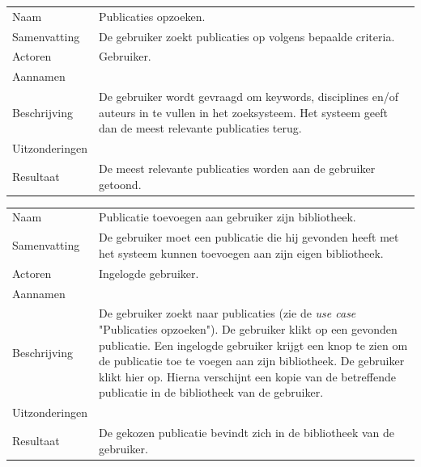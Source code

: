 \begin{longtable}{lp{10cm}}
Naam           & Publicaties opzoeken.\\
Samenvatting   & De gebruiker zoekt publicaties op volgens bepaalde criteria.\\
Actoren        & Gebruiker.\\
Aannamen       & \\
Beschrijving   & De gebruiker wordt gevraagd om keywords, disciplines en/of auteurs in te vullen in het zoeksysteem. Het systeem geeft dan de meest relevante publicaties terug.\\
Uitzonderingen & \\
Resultaat      & De meest relevante publicaties worden aan de gebruiker getoond.\\
\end{longtable}


\begin{longtable}{lp{10cm}}
Naam           & Publicatie toevoegen aan gebruiker zijn bibliotheek.\\
Samenvatting   & De gebruiker moet een publicatie die hij gevonden heeft met het systeem kunnen toevoegen aan zijn eigen bibliotheek.\\
Actoren        & Ingelogde gebruiker.\\
Aannamen       & \\
Beschrijving   & De gebruiker zoekt naar publicaties (zie de \textit{use case} "Publicaties opzoeken"). De gebruiker klikt op een gevonden publicatie. Een ingelogde gebruiker krijgt een knop te zien om de publicatie toe te voegen aan zijn bibliotheek. De gebruiker klikt hier op. Hierna verschijnt een kopie van de betreffende publicatie in de bibliotheek van de gebruiker.\\
Uitzonderingen & \\
Resultaat      & De gekozen publicatie bevindt zich in de bibliotheek van de gebruiker.\\
\end{longtable}


